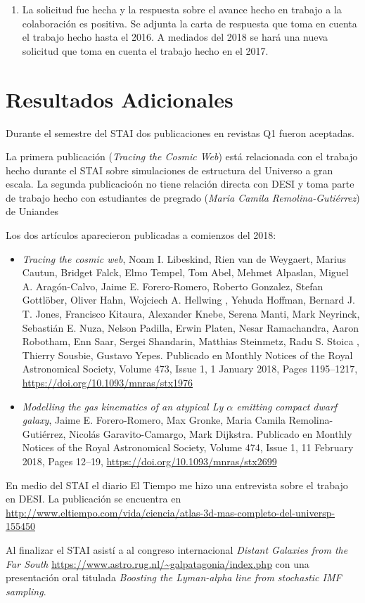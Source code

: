 \documentclass[12pt,spanish]{article}
\begin{document}
\begin{enumerate}
Esperamos enviarlo a publicaci\'on a mediados del 2018. 
  

\item La solicitud fue hecha y la respuesta sobre el avance hecho en
  trabajo a la colaboraci\'on es positiva. Se adjunta la carta de
  respuesta que toma en cuenta el trabajo hecho hasta el 2016. 
  A mediados del 2018 se har\'a una nueva solicitud que
  toma en cuenta el trabajo hecho en el 2017.
\end{enumerate}


\section*{Resultados Adicionales}

Durante el semestre del STAI dos publicaciones en revistas Q1 fueron
aceptadas.

La primera publicaci\'on (\emph{Tracing the Cosmic Web}) est\'a
relacionada con el trabajo hecho durante el STAI sobre simulaciones
de estructura del Universo a gran escala. 
La segunda publicacio\'on no tiene relaci\'on directa con DESI y toma
parte de trabajo hecho con estudiantes de pregrado (\emph{Maria Camila
  Remolina-Guti\'errez}) de Uniandes


Los dos art\'iculos aparecieron publicadas a comienzos del 2018:

\begin{itemize}

\item{{\it Tracing the cosmic web}, Noam I. Libeskind,  Rien van de
  Weygaert,  Marius Cautun,  Bridget Falck, Elmo Tempel,  Tom Abel,  Mehmet
  Alpaslan,  Miguel A. Aragón-Calvo, Jaime E. Forero-Romero,  Roberto
  Gonzalez,  Stefan Gottlöber,  Oliver Hahn, Wojciech A. Hellwing , Yehuda
  Hoffman,  Bernard J. T. Jones,  Francisco Kitaura, Alexander Knebe,
  Serena Manti,  Mark Neyrinck,  Sebastián E. Nuza, Nelson Padilla,  Erwin
  Platen,  Nesar Ramachandra,  Aaron Robotham,  Enn Saar, Sergei Shandarin,
  Matthias Steinmetz,  Radu S. Stoica , Thierry Sousbie, Gustavo Yepes. 
Publicado en Monthly Notices of the Royal Astronomical Society, Volume
473, Issue 1, 1 January 2018, Pages 1195–1217,
\url{https://doi.org/10.1093/mnras/stx1976}}
\item{{\it Modelling the gas kinematics of an atypical Ly $\alpha$ emitting
    compact dwarf galaxy}, Jaime E. Forero-Romero,  Max Gronke,  Maria
  Camila Remolina-Gutiérrez, Nicolás Garavito-Camargo,  Mark Dijkstra.
  Publicado en Monthly Notices of the Royal Astronomical Society,
  Volume 474, Issue 1, 11 February 2018, Pages 12–19,
  \url{https://doi.org/10.1093/mnras/stx2699}} 

\end{itemize}

En medio del STAI el diario El Tiempo me hizo una entrevista sobre el
trabajo en DESI. La publicaci\'on se encuentra en \url{http://www.eltiempo.com/vida/ciencia/atlas-3d-mas-completo-del-universp-155450}

Al finalizar el STAI asist\'i a al congreso internacional
\emph{Distant Galaxies from the Far South}
\url{https://www.astro.rug.nl/~galpatagonia/index.php} con una
presentaci\'on oral titulada \emph{Boosting the Lyman-alpha
line from stochastic IMF sampling}.
\end{document}
